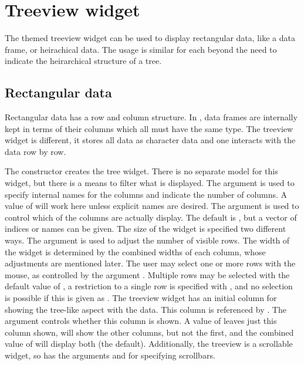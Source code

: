 \section{Treeview widget}
\label{sec:tcltk:treeview-widget}

The themed treeview widget can be used to display rectangular data,
like a data frame, or heirachical data. The usage is similar for each beyond the need to indicate the heirarchical structure of a tree.

\subsection{Rectangular data}


Rectangular data has a row and column structure. In \R, data frames are internally kept in terms of their columns which all must have the same type. The treeview widget is different, it stores all data as character data and one interacts with the data row by row. 

The  constructor creates the tree widget. There is no separate model for this widget, but there is a means to filter what is displayed.
The argument  is used to specify internal names for the columns and indicate the number of columns. A value of  will work here unless explicit names are desired. The argument  is used to control which of the columns are actually display. The default is , but a vector of indices or names can be given. 
The size of the widget is specified two different ways. 
The   argument is used to adjust the number of visible rows. The width of the widget is determined by the combined widths of each column, whose adjustments are mentioned later. The user may select one or more rows with the mouse, as controlled by the argument . Multiple rows may be selected with the default value of , a restriction to a single row is specified with , and no selection is possible if this is given as . 
The treeview widget has an initial column for showing the tree-like aspect with the data. This column is referenced by . The  argument controls whether this column is shown. A value of  leaves just this column shown,  will show the other columns, but not the first, and the combined value of  will display both (the default). 
Additionally, the treeview is a scrollable widget, so has the arguments  and  for specifying scrollbars. 


